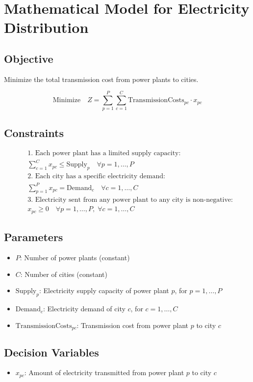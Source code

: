 \documentclass{article}
\begin{document}
\section*{Mathematical Model for Electricity Distribution}

\subsection*{Objective}
Minimize the total transmission cost from power plants to cities.

\begin{equation}
\text{Minimize} \quad Z = \sum_{p=1}^{P} \sum_{c=1}^{C} \text{TransmissionCosts}_{pc} \cdot x_{pc}
\end{equation}

\subsection*{Constraints}

\begin{align}
& \text{1. Each power plant has a limited supply capacity:} \nonumber \\
& \sum_{c=1}^{C} x_{pc} \leq \text{Supply}_p \quad \forall p = 1, \ldots, P \\
& \text{2. Each city has a specific electricity demand:} \nonumber \\
& \sum_{p=1}^{P} x_{pc} = \text{Demand}_c \quad \forall c = 1, \ldots, C \\
& \text{3. Electricity sent from any power plant to any city is non-negative:} \nonumber \\
& x_{pc} \geq 0 \quad \forall p = 1, \ldots, P, \; \forall c = 1, \ldots, C
\end{align}

\subsection*{Parameters}

\begin{itemize}
    \item $P$: Number of power plants (constant)
    \item $C$: Number of cities (constant)
    \item $\text{Supply}_p$: Electricity supply capacity of power plant $p$, for $p = 1, \ldots, P$
    \item $\text{Demand}_c$: Electricity demand of city $c$, for $c = 1, \ldots, C$
    \item $\text{TransmissionCosts}_{pc}$: Transmission cost from power plant $p$ to city $c$
\end{itemize}

\subsection*{Decision Variables}

\begin{itemize}
    \item $x_{pc}$: Amount of electricity transmitted from power plant $p$ to city $c$
\end{itemize}
\end{document}
